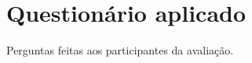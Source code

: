 \chapter{Questionário aplicado}\label{ap:questionario}

Perguntas feitas aos participantes da avaliação.
